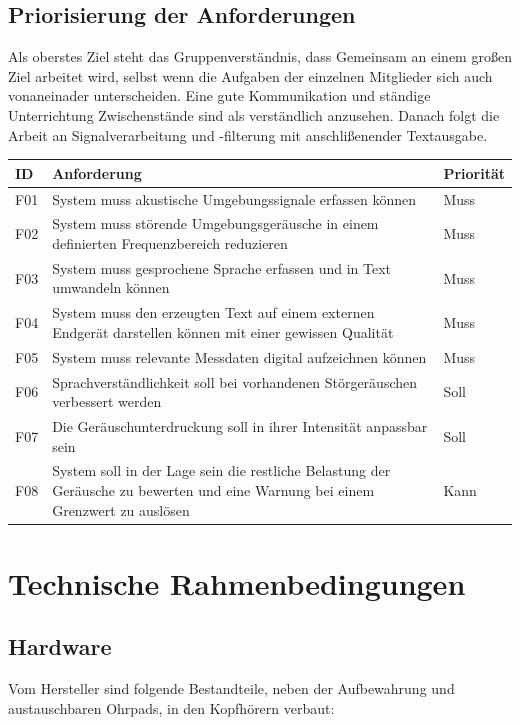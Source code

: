 \documentclass{article}
\begin{document}
\subsection{Priorisierung der Anforderungen}
Als oberstes Ziel steht das Gruppenverständnis, dass Gemeinsam an einem großen Ziel arbeitet wird, selbst wenn die Aufgaben der einzelnen Mitglieder sich auch vonaneinader unterscheiden. Eine gute Kommunikation und ständige Unterrichtung Zwischenstände sind als verständlich anzusehen. 
Danach folgt die Arbeit an Signalverarbeitung und -filterung mit anschlißenender Textausgabe.
\begin{tabularx}{\textwidth}{ |>{\centering\arraybackslash}p{1.1cm}|>{\raggedright\arraybackslash}X|>{\centering\arraybackslash}p{1.7cm}| }
\hline
\rowcolor{Turquoise} 
\arrayrulecolor[HTML]{DB5800}
ID & Anforderung & Priorität \\
\hline
         F01 & System muss akustische Umgebungssignale erfassen können & Muss \\
\hline
         F02 & System muss störende Umgebungsgeräusche in einem definierten Frequenzbereich reduzieren & Muss \\
\hline
         F03 & System muss gesprochene Sprache erfassen und in Text umwandeln können & Muss \\
\hline
         F04 & System muss den erzeugten Text auf einem externen Endgerät darstellen können mit einer gewissen Qualität & Muss \\
\hline
         F05 & System muss relevante Messdaten digital aufzeichnen können & Muss \\
\hline
          F06 & Sprachverständlichkeit soll bei vorhandenen Störgeräuschen verbessert werden & Soll \\
\hline
          F07 & Die Geräuschunterdruckung soll in ihrer Intensität anpassbar sein & Soll \\
\hline
         F08 & System soll in der Lage sein die restliche Belastung der Geräusche zu bewerten und eine Warnung bei einem Grenzwert zu auslösen & Kann \\
\hline
\end{tabularx}

\section{Technische Rahmenbedingungen}

\subsection{Hardware}
Vom Hersteller sind folgende Bestandteile, neben der Aufbewahrung und austauschbaren Ohrpads, in den Kopfhörern verbaut:
\end{document}
